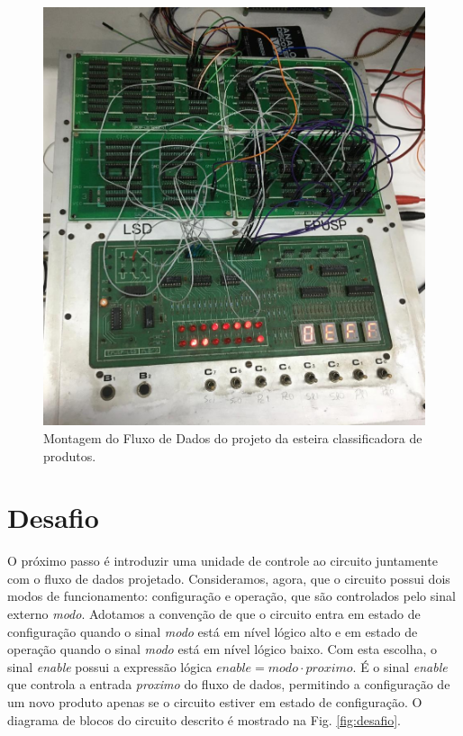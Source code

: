 \documentclass[a4,12pt]{horizon-theme}
\begin{document}
\begin{figure}[!ht]
    \centering
    \includegraphics[width=\textwidth]{montagem.jpeg}
    \caption{Montagem do Fluxo de Dados do projeto da esteira classificadora de produtos.}
    \label{fig:montagem}
\end{figure}

\section{Desafio}

O próximo passo é introduzir uma unidade de controle ao circuito juntamente com o fluxo de dados projetado. Consideramos, agora, que o circuito possui dois modos de funcionamento: configuração e operação, que são controlados pelo sinal externo \emph{modo}. Adotamos a convenção de que o circuito entra em estado de configuração quando o sinal \emph{modo} está em nível lógico alto e em estado de operação quando o sinal \emph{modo} está em nível lógico baixo. Com esta escolha, o sinal \emph{enable} possui a expressão lógica $enable = modo \cdot proximo$. É o sinal \emph{enable} que controla a entrada \emph{proximo} do fluxo de dados, permitindo a configuração de um novo produto apenas se o circuito estiver em estado de configuração. O diagrama de blocos do  circuito descrito é mostrado na Fig. \ref{fig:desafio}.
\end{document}
